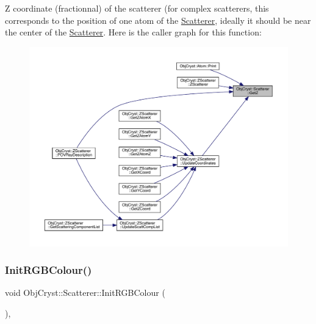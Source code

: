 Z coordinate (fractionnal) of the scatterer (for complex scatterers, this corresponds to the position of one atom of the \mbox{\hyperlink{class_obj_cryst_1_1_scatterer}{Scatterer}}, ideally it should be near the center of the \mbox{\hyperlink{class_obj_cryst_1_1_scatterer}{Scatterer}}. Here is the caller graph for this function\+:
\nopagebreak
\begin{figure}[H]
\begin{center}
\leavevmode
\includegraphics[width=350pt]{class_obj_cryst_1_1_scatterer_ac1d8f78fc091087c13664b6186923616_icgraph}
\end{center}
\end{figure}
\mbox{\label{class_obj_cryst_1_1_scatterer_a3edeffbf1cf3223663d9a7aa4bd321b1}} 
\subsubsection{\texorpdfstring{InitRGBColour()}{InitRGBColour()}}
{\footnotesize\ttfamily void Obj\+Cryst\+::\+Scatterer\+::\+Init\+R\+G\+B\+Colour (\begin{DoxyParamCaption}{ }\end{DoxyParamCaption})\hspace{0.3cm}{\ttfamily [protected]}, {\ttfamily [virtual]}}

